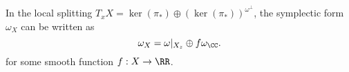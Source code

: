 

    In the local splitting $T_xX=\ker(\pi_*)\oplus(\ker(\pi_*))^{\omega^\bot}$, the symplectic form $\omega_X$ can be written as  
    \[\omega_X=\omega|_{X_z}\oplus f\omega_\CC.\]
    for some smooth function $f:X\to \RR$.

